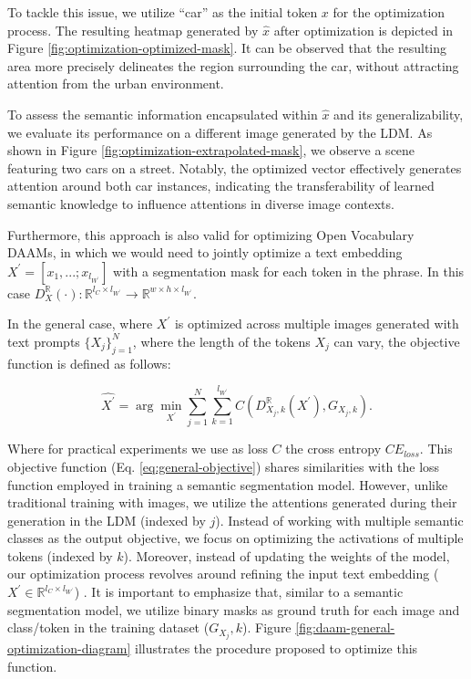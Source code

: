 To tackle this issue, we utilize ``car'' as the initial token $x$ for the optimization process. The resulting heatmap generated by $\hat{x}$ after optimization is depicted in Figure \ref{fig:optimization-optimized-mask}. It can be observed that the resulting area more precisely delineates the region surrounding the car, without attracting attention from the urban environment.

To assess the semantic information encapsulated within $\hat{x}$ and its generalizability, we evaluate its performance on a different image generated by the LDM. As shown in Figure \ref{fig:optimization-extrapolated-mask}, we observe a scene featuring two cars on a street. Notably, the optimized vector effectively generates attention around both car instances, indicating the transferability of learned semantic knowledge to influence attentions in diverse image contexts.

Furthermore, this approach is also valid for optimizing Open Vocabulary DAAMs, in which we would need to jointly optimize a text embedding $X^\prime = [x_1, ...; x_{l_{W^\prime}}]$ with a segmentation mask for each token in the phrase. In this case $D^\mathbb{R}_X\left ( \cdot \right):\mathbb{R}^{l_C \times l_{W^\prime}} \to \mathbb{R}^{w \times h \times l_{W^\prime}}$. 

In the general case, where $X^\prime$ is optimized across multiple images generated with text prompts $\{X_j\}_{j=1}^N$, where the length of the tokens $X_j$ can vary, the objective function is defined as follows:

\begin{equation}
\label{eq:general-objective}
    \hat{X^\prime} = \arg\min_{X^\prime} \sum_{j=1}^N \sum_{k=1}^{l_{W^\prime}} C \left ( D_{ X_j, k}^{\mathbb{R}}\left ( X^\prime \right ), G_{X_j, k} \right ) .
\end{equation}

Where for practical experiments we use as loss $C$ the cross entropy $CE_{loss}$.
This objective function (Eq. \ref{eq:general-objective}) shares similarities with the loss function employed in training a semantic segmentation model. However, unlike traditional training with images, we utilize the attentions generated during their generation in the LDM (indexed by $j$). Instead of working with multiple semantic classes as the output objective, we focus on optimizing the activations of multiple tokens (indexed by $k$). Moreover, instead of updating the weights of the model, our optimization process revolves around refining the input text embedding ($X^\prime \in \mathbb{R}^{l_C \times l_{W^\prime}}$) . It is important to emphasize that, similar to a semantic segmentation model, we utilize binary masks as ground truth for each image and class/token in the training dataset ($G_{X_j}, k$). Figure \ref{fig:daam-general-optimization-diagram} illustrates the procedure proposed to optimize this function.

